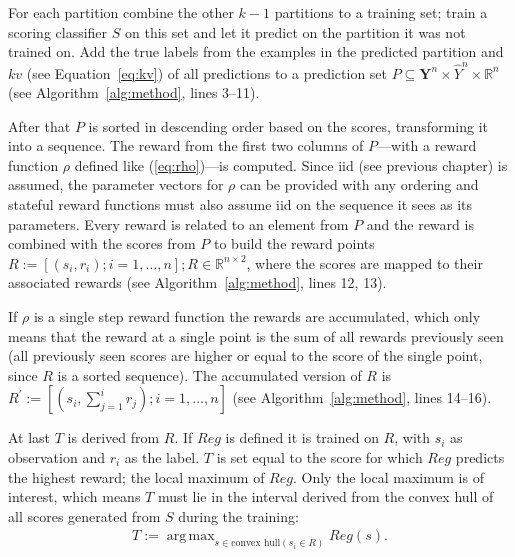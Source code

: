 \documentclass[twoside,11pt]{article}
\DeclareMathOperator*{\argmax}{arg\,max}
\def\Y{\textbf{Y}}
\begin{document}
For each partition combine the other $k-1$ partitions to a
training set; train a scoring classifier $S$ on this
set and let it predict on the partition it was not trained
on.
Add the true labels from the examples in the predicted
partition and $kv$ (see Equation~\ref{eq:kv}) of all
predictions to a prediction set
$P \subseteq \Y^n \times \hat{Y}^n \times \mathbb{R}^n$
(see Algorithm~\ref{alg:method}, lines 3--11).

After that $P$ is sorted in descending order based on the
scores, transforming it into a sequence.
The reward from the first two columns of $P$---with a
reward function $\rho$ defined like (\ref{eq:rho})---is
computed.
Since iid (see previous chapter) is assumed, the parameter
vectors for $\rho$ can be provided with any ordering and
stateful reward functions must also assume iid on the
sequence it sees as its parameters.
Every reward is related to an element from $P$ and the
reward is combined with the scores from $P$ to build the
reward points $R := [(s_i, r_i); i=1,\dots,n]; R \in
\mathbb{R}^{n \times 2}$, where the scores are mapped to
their associated rewards
(see Algorithm~\ref{alg:method}, lines 12, 13).

If $\rho$ is a single step reward function the rewards
are accumulated, which only means that the reward at a
single point is the sum of all rewards previously seen
(all previously seen scores are higher or equal to the
score of the single point, since $R$ is a sorted sequence).
The accumulated version of $R$ is
$R^\prime := [(s_i, \sum_{j=1}^{i} r_j); i=1,\dots,n]$
(see Algorithm~\ref{alg:method}, lines 14--16).

At last $T$ is derived from $R$. If $Reg$ is defined it
is trained on $R$, with $s_i$ as observation and $r_i$ as
the label. $T$ is set equal to the score for which $Reg$
predicts the highest reward; the local maximum of $Reg$.
Only the local maximum is of interest, which means $T$
must lie in the interval derived from the convex hull of
all scores generated from $S$ during the training:
\begin{align}
  \label{eq:T_Reg}
  T := \argmax_{s \in \text{convex hull}(s_i \in R)}
        Reg(s).
\end{align}
\end{document}
